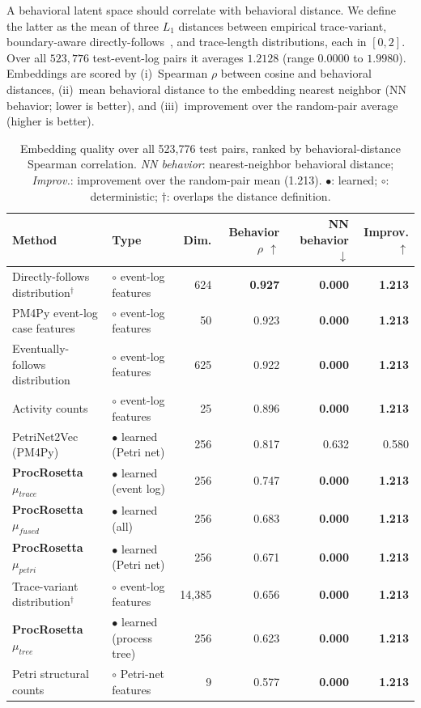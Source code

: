 \documentclass[manuscript,screen,nonacm]{acmart}
\begin{document}
A behavioral latent space should correlate with behavioral distance. We define the latter as the mean of three $L_1$ distances between empirical trace-variant, boundary-aware directly-follows~\cite{vanDerAalst2019DFG}, and trace-length distributions, each in $[0,2]$. Over all $523{,}776$ test-event-log pairs it averages $1.2128$ (range $0.0000$ to $1.9980$). Embeddings are scored by (i)~Spearman $\rho$ between cosine and behavioral distances, (ii)~mean behavioral distance to the embedding nearest neighbor (NN behavior; lower is better), and (iii)~improvement over the random-pair average (higher is better).

\begin{table}
\caption{Embedding quality over all 523{,}776 test pairs, ranked by behavioral-distance Spearman correlation. \emph{NN behavior}: nearest-neighbor behavioral distance; \emph{Improv.}: improvement over the random-pair mean (1.213). $\bullet$: learned; $\circ$: deterministic; $\dagger$: overlaps the distance definition.}
\label{tab:embedding}
\small
\begin{tabular}{llrrrr}
\toprule
Method & Type & Dim. & Behavior $\rho$ $\uparrow$ & NN behavior $\downarrow$ & Improv. $\uparrow$ \\
\midrule
Directly-follows distribution$^\dagger$ & $\circ$ event-log features & 624 & \textbf{0.927} & \textbf{0.000} & \textbf{1.213} \\
PM4Py event-log case features & $\circ$ event-log features & 50 & 0.923 & \textbf{0.000} & \textbf{1.213} \\
Eventually-follows distribution & $\circ$ event-log features & 625 & 0.922 & \textbf{0.000} & \textbf{1.213} \\
Activity counts & $\circ$ event-log features & 25 & 0.896 & \textbf{0.000} & \textbf{1.213} \\
PetriNet2Vec (PM4Py)~\cite{Colonna2024} & $\bullet$ learned (Petri net) & 256 & 0.817 & 0.632 & 0.580 \\
\textbf{ProcRosetta} $\mu_{\mathit{trace}}$ & $\bullet$ learned (event log) & 256 & 0.747 & \textbf{0.000} & \textbf{1.213} \\
\textbf{ProcRosetta} $\mu_{\mathit{fused}}$ & $\bullet$ learned (all) & 256 & 0.683 & \textbf{0.000} & \textbf{1.213} \\
\textbf{ProcRosetta} $\mu_{\mathit{petri}}$ & $\bullet$ learned (Petri net) & 256 & 0.671 & \textbf{0.000} & \textbf{1.213} \\
Trace-variant distribution$^\dagger$ & $\circ$ event-log features & 14{,}385 & 0.656 & \textbf{0.000} & \textbf{1.213} \\
\textbf{ProcRosetta} $\mu_{\mathit{tree}}$ & $\bullet$ learned (process tree) & 256 & 0.623 & \textbf{0.000} & \textbf{1.213} \\
Petri structural counts & $\circ$ Petri-net features & 9 & 0.577 & \textbf{0.000} & \textbf{1.213} \\
\bottomrule
\end{tabular}
\end{table}
\end{document}
